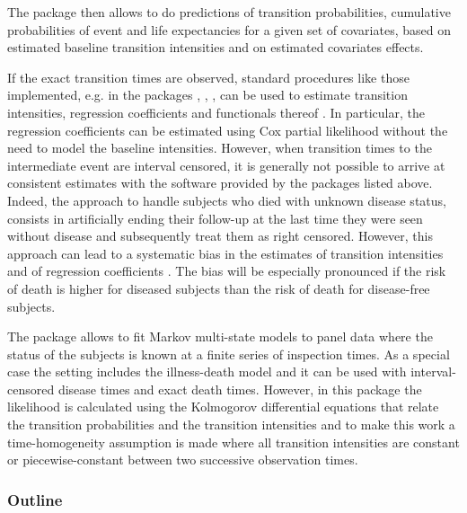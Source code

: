 \documentclass[article]{jss}
\begin{document}
The package  then allows to do predictions of
transition probabilities, cumulative probabilities of event and 
life expectancies for a given set of covariates, 
based on estimated baseline transition intensities and on estimated 
covariates effects. 

If the exact transition times are observed, standard procedures like
those implemented, e.g. in the packages , ,
,  can be used to estimate transition
intensities, regression coefficients and functionals thereof
\citep[see][]{deWreede_Fiocco_Putter_2010, beyersmann2011competing}.
In particular, the regression coefficients can be estimated using Cox
partial likelihood \citep{coxpartial} without the need to model the
baseline intensities. However, when transition times to the
intermediate event are interval censored, it is generally not possible
to arrive at consistent estimates with the software provided by the
packages listed above. 
Indeed, the approach to handle subjects who died with unknown disease 
status, consists in artificially ending their follow-up 
at the last time they were seen without disease and subsequently 
treat them as right censored. 
However, this approach can lead to a systematic bias in the
estimates of transition intensities and of regression coefficients
\citep{Joly_Commenges_Helmer_Letenneur_2002, Leffondre_2013}. The bias
will be especially pronounced if the risk of death is higher for
diseased subjects than the risk of death for disease-free subjects.

The  package \citep{Jackson_2010} allows to fit Markov
multi-state models to panel data where the status of the subjects is
known at a finite series of inspection times. As a special case the
setting includes the illness-death model and it can be used with
interval-censored disease times and exact death times. However, in
this package the likelihood is calculated using the Kolmogorov
differential equations that relate the transition probabilities and
the transition intensities and to make this work a time-homogeneity
assumption is made where all transition intensities are constant or
piecewise-constant between two successive observation times.

\subsubsection{Outline}
\label{sec-1-0-1}
\end{document}

